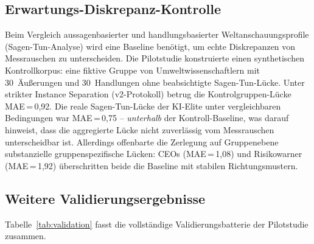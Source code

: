 \documentclass[11pt,a4paper]{article}
\begin{document}
\subsection{Erwartungs-Diskrepanz-Kontrolle}
\label{sec:qa:discrepancy}

Beim Vergleich aussagenbasierter und handlungsbasierter Weltanschauungsprofile (Sagen-Tun-Analyse) wird eine Baseline ben\"otigt, um echte Diskrepanzen von Messrauschen zu unterscheiden. Die Pilotstudie konstruierte einen synthetischen Kontrollkorpus: eine fiktive Gruppe von Umweltwissenschaftlern mit 30~\"Au\ss{}erungen und 30~Handlungen ohne beabsichtigte Sagen-Tun-L\"ucke. Unter strikter Instance Separation (v2-Protokoll) betrug die Kontrolgruppen-L\"ucke MAE\,=\,0,92. Die reale Sagen-Tun-L\"ucke der KI-Elite unter vergleichbaren Bedingungen war MAE\,=\,0,75 -- \emph{unterhalb} der Kontroll-Baseline, was darauf hinweist, dass die aggregierte L\"ucke nicht zuverl\"assig vom Messrauschen unterscheidbar ist. Allerdings offenbarte die Zerlegung auf Gruppenebene substanzielle gruppenspezifische L\"ucken: CEOs (MAE\,=\,1,08) und Risikowarner (MAE\,=\,1,92) \"uberschritten beide die Baseline mit stabilen Richtungsmustern.


\subsection{Weitere Validierungsergebnisse}
\label{sec:qa:additional}

Tabelle~\ref{tab:validation} fasst die vollst\"andige Validierungsbatterie der Pilotstudie zusammen.
\end{document}
